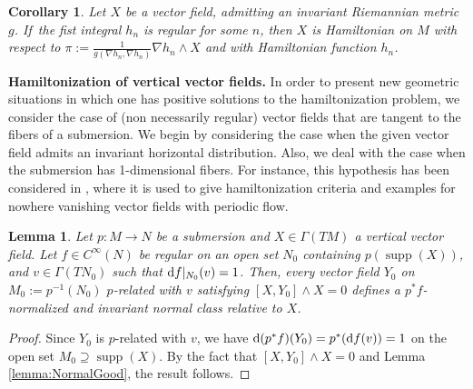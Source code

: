 \documentclass[pdftex]{sigma}%
\newcommand{\dd}{{\rm d}}
\numberwithin{equation}{section}
\newtheorem{Corollary}[Theorem]{Corollary}
\newtheorem{Lemma}[Theorem]{Lemma}
\begin{document}
\begin{Corollary}%
Let $X$ be a vector field, admitting an invariant Riemannian metric $g$. If~the fist integral $h_n$ is regular for some $n$, then $X$ is Hamiltonian on $M$ with respect to $\pi:=\frac{1}{g(\nabla h_{n},\nabla h_{n})}\nabla h_{n}\wedge X$ and with Hamiltonian function $h_{n}$.
\end{Corollary}

{\bf Hamiltonization of vertical vector fields.} In order to present new geometric situations in which one has positive solutions to the hamiltonization problem, we consider the case of (non necessarily regular) vector fields that are tangent to the fibers of a submersion. We begin by considering the case when the given vector field admits an invariant horizontal distribution. Also, we deal with the case when the submersion has 1-dimensional fibers. For instance, this hypothesis has been considered in \cite{FGS-05}, where it is used to give hamiltonization criteria and examples for nowhere vanishing vector fields with periodic flow.

\begin{Lemma}\label{lemma:NormalProy}
Let $p\colon M \to N$ be a submersion and $X \in \Gamma(TM)$ a vertical vector field. Let $f \in C^{\infty}(N)$ be regular on an open set $N_0$ containing $p(\operatorname{supp}(X))$, and $v \in \Gamma(TN_0)$ such that $\dd{f}|_{N_0}(v) = 1$. Then, every vector field $Y_0$ on $M_0:=p^{-1}(N_0)$ $p$-related with $v$ satisfying $[X,Y_0]\wedge X=0$ defines a $p^{*}f$-normalized and invariant normal class relative to $X$.
\end{Lemma}
\begin{proof}
Since $Y_0$ is $p$-related with $v$, we have $\dd (p^{*}f)(Y_0) = p^{*}(\dd f(v))=1$ on the open set $M_0 \supseteq \operatorname{supp}(X)$. By the fact that $[X,Y_0] \wedge X=0$ and Lemma \ref{lemma:NormalGood}, the result follows.
\end{proof}
\end{document}

